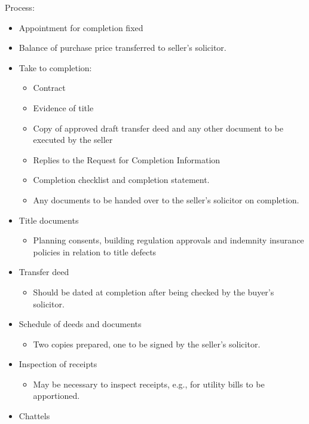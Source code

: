 \documentclass[
]{article}
\providecommand{\tightlist}{%
  \setlength{\itemsep}{0pt}\setlength{\parskip}{0pt}}
\begin{document}
Process:

\begin{itemize}
\tightlist
\item
  Appointment for completion fixed
\item
  Balance of purchase price transferred to seller's solicitor.
\item
  Take to completion:

  \begin{itemize}
  \tightlist
  \item
    Contract
  \item
    Evidence of title
  \item
    Copy of approved draft transfer deed and any other document to be
    executed by the seller
  \item
    Replies to the Request for Completion Information
  \item
    Completion checklist and completion statement.
  \item
    Any documents to be handed over to the seller's solicitor on
    completion.
  \end{itemize}
\item
  Title documents

  \begin{itemize}
  \tightlist
  \item
    Planning consents, building regulation approvals and indemnity
    insurance policies in relation to title defects
  \end{itemize}
\item
  Transfer deed

  \begin{itemize}
  \tightlist
  \item
    Should be dated at completion after being checked by the buyer's
    solicitor.
  \end{itemize}
\item
  Schedule of deeds and documents

  \begin{itemize}
  \tightlist
  \item
    Two copies prepared, one to be signed by the seller's solicitor.
  \end{itemize}
\item
  Inspection of receipts

  \begin{itemize}
  \tightlist
  \item
    May be necessary to inspect receipts, e.g., for utility bills to be
    apportioned.
  \end{itemize}
\item
  Chattels


\end{itemize}
\end{document}
